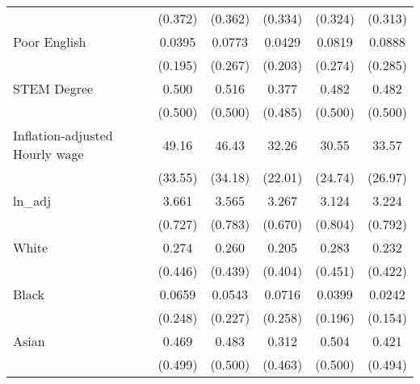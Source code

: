 \begin{table}[htbp]
\begin{tabular}{l*{5}{c}}
                    &     (0.372)         &     (0.362)         &     (0.334)         &     (0.324)         &     (0.313)         \\
[1em]
Poor English        &      0.0395         &      0.0773         &      0.0429         &      0.0819         &      0.0888         \\
                    &     (0.195)         &     (0.267)         &     (0.203)         &     (0.274)         &     (0.285)         \\
[1em]
STEM Degree         &       0.500         &       0.516         &       0.377         &       0.482         &       0.482         \\
                    &     (0.500)         &     (0.500)         &     (0.485)         &     (0.500)         &     (0.500)         \\
[1em]
Inflation-adjusted Hourly wage&       49.16         &       46.43         &       32.26         &       30.55         &       33.57         \\
                    &     (33.55)         &     (34.18)         &     (22.01)         &     (24.74)         &     (26.97)         \\
[1em]
ln\_adj              &       3.661         &       3.565         &       3.267         &       3.124         &       3.224         \\
                    &     (0.727)         &     (0.783)         &     (0.670)         &     (0.804)         &     (0.792)         \\
[1em]
White               &       0.274         &       0.260         &       0.205         &       0.283         &       0.232         \\
                    &     (0.446)         &     (0.439)         &     (0.404)         &     (0.451)         &     (0.422)         \\
[1em]
Black               &      0.0659         &      0.0543         &      0.0716         &      0.0399         &      0.0242         \\
                    &     (0.248)         &     (0.227)         &     (0.258)         &     (0.196)         &     (0.154)         \\
[1em]
Asian               &       0.469         &       0.483         &       0.312         &       0.504         &       0.421         \\
                    &     (0.499)         &     (0.500)         &     (0.463)         &     (0.500)         &     (0.494)         \\

\end{tabular}
\end{table}
